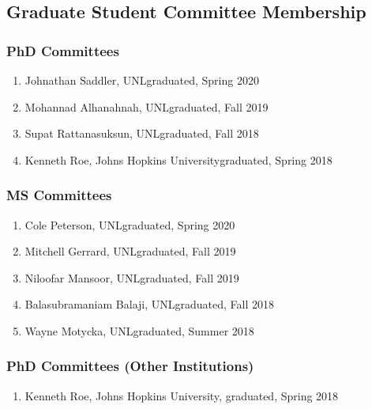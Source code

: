 \documentclass[11pt]{article}
\begin{document}
{      \subsection{Graduate Student Committee Membership}
      \subsubsection{PhD Committees}
      \begin{enumerate}
        \item Johnathan Saddler, UNL\hfill graduated, Spring 2020
        \item Mohannad Alhanahnah, UNL\hfill graduated, Fall 2019
        \item Supat Rattanasuksun, UNL\hfill graduated, Fall 2018
        \item Kenneth Roe,  Johns Hopkins University\hfill graduated, Spring 2018
      \end{enumerate}

      \subsubsection{MS Committees}
      \begin{enumerate}
        \item Cole Peterson, UNL\hfill graduated, Spring 2020
        \item Mitchell Gerrard, UNL\hfill graduated, Fall 2019
        \item Niloofar Mansoor, UNL\hfill graduated, Fall 2019
        \item Balasubramaniam Balaji, UNL\hfill graduated, Fall 2018
        \item Wayne Motycka, UNL\hfill graduated, Summer 2018
      \end{enumerate}


      \subsubsection{PhD Committees (Other Institutions)}
      \begin{enumerate}
        \item Kenneth Roe,  Johns Hopkins University,  graduated, Spring 2018
      \end{enumerate}

    }
\end{document}

